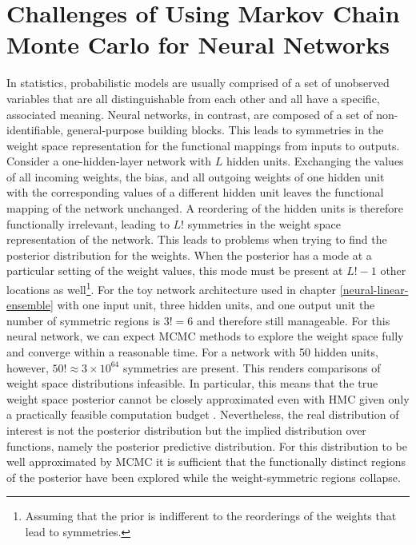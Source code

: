 \documentclass[../thesis.tex]{subfiles}
\begin{document}
\section{Challenges of Using Markov Chain Monte Carlo for Neural Networks}
In statistics, probabilistic models are usually comprised of a set of unobserved variables that are all distinguishable from each other and all have a specific, associated meaning. Neural networks, in contrast, are composed of a set of non-identifiable, general-purpose building blocks. This leads to symmetries in the weight space representation for the functional mappings from inputs to outputs. Consider a one-hidden-layer network with $L$ hidden units. Exchanging the values of all incoming weights, the bias, and all outgoing weights of one hidden unit with the corresponding values of a different hidden unit leaves the functional mapping of the network unchanged. A reordering of the hidden units is therefore functionally irrelevant, leading to $L!$ symmetries in the weight space representation of the network. This leads to problems when trying to find the posterior distribution for the weights. When the posterior has a mode at a particular setting of the weight values, this mode must be present at $L! - 1$ other locations as well\footnote{Assuming that the prior is indifferent to the reorderings of the weights that lead to symmetries.}. 
For the toy network architecture used in chapter \ref{neural-linear-ensemble} with one input unit, three hidden units, and one output unit the number of symmetric regions is $3!=6$ and therefore still manageable. For this neural network, we can expect MCMC methods to explore the weight space fully and converge within a reasonable time. For a network with 50 hidden units, however, $50!\approx3\times 10^{64}$ symmetries are present. This renders comparisons of weight space distributions infeasible. In particular, this means that the true weight space posterior cannot be closely approximated even with HMC given only a practically feasible computation budget \parencite{papamarkou2019challenges}. Nevertheless, the real distribution of interest is not the posterior distribution but the implied distribution over functions, namely the posterior predictive distribution. For this distribution to be well approximated by MCMC it is sufficient that the functionally distinct regions of the posterior have been explored while the weight-symmetric regions collapse.
\end{document}
